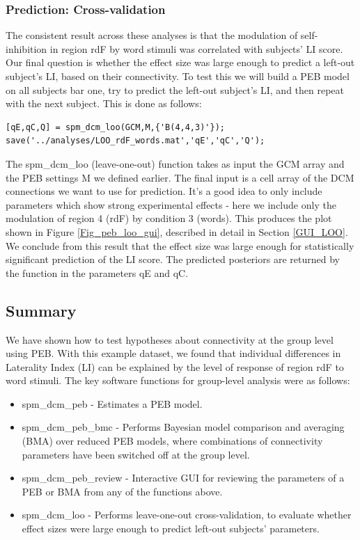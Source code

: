 \documentclass{article}
\begin{document}
\subsubsection{Prediction: Cross-validation}
The consistent result across these analyses is that the modulation of self-inhibition in region rdF by word stimuli was correlated with subjects' LI score. Our final question is whether the effect size was large enough to predict a left-out subject's LI, based on their connectivity. To test this we will build a PEB model on all subjects bar one, try to predict the left-out subject's LI, and then repeat with the next subject. This is done as follows:

\begin{lstlisting}[style=Matlab-editor,caption=Cross-validation]
[qE,qC,Q] = spm_dcm_loo(GCM,M,{'B(4,4,3)'});
save('../analyses/LOO_rdF_words.mat','qE','qC','Q');
\end{lstlisting}

The spm\_dcm\_loo (leave-one-out) function takes as input the GCM array and the PEB settings M we defined earlier. The final input is a cell array of the DCM connections we want to use for prediction. It's a good idea to only include parameters which show strong experimental effects - here we include only the modulation of region 4 (rdF) by condition 3 (words). This produces the plot shown in Figure \ref{Fig_peb_loo_gui}, described in detail in Section \ref{GUI_LOO}. We conclude from this result that the effect size was large enough for statistically significant prediction of the LI score. The predicted posteriors are returned by the function in the parameters qE and qC.

\subsection{Summary}

We have shown how to test hypotheses about connectivity at the group level using PEB. With this example dataset, we found that individual differences in Laterality Index (LI) can be explained by the level of response of region rdF to word stimuli. The key software functions for group-level analysis were as follows:

\begin{itemize}
    \item spm\_dcm\_peb - Estimates a PEB model.
    \item spm\_dcm\_peb\_bmc - Performs Bayesian model comparison and averaging (BMA) over reduced PEB models, where combinations of connectivity parameters have been switched off at the group level.
    \item spm\_dcm\_peb\_review - Interactive GUI for reviewing the parameters of a PEB or BMA from any of the functions above.
    \item spm\_dcm\_loo - Performs leave-one-out cross-validation, to evaluate whether effect sizes were large enough to predict left-out subjects' parameters.
\end{itemize}
\end{document}
